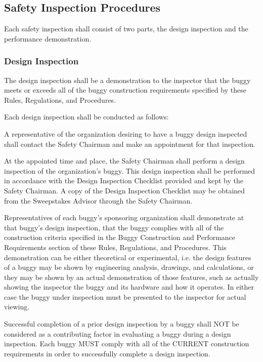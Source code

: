 \subsection{Safety Inspection Procedures}

	Each safety inspection shall consist of two parts, the design inspection and
	the performance demonstration.

\subsubsection{Design Inspection}

	The design inspection shall be a demonstration to the inspector that the buggy
	meets or exceeds all of the buggy construction requirements specified by these
	Rules, Regulations, and Procedures.

	Each design inspection shall be conducted as follows:

	A representative of the organization desiring to have a buggy design inspected
	shall contact the Safety Chairman and make an appointment for that inspection.

	At the appointed time and place, the Safety Chairman shall perform a design
	inspection of the organization's buggy. This design inspection shall be
	performed in accordance with the Design Inspection Checklist provided and kept
	by the Safety Chairman. A copy of the Design Inspection Checklist may be
	obtained from the Sweepstakes Advisor through the Safety Chairman.

	Representatives of each buggy's sponsoring organization shall demonstrate at
	that buggy's design inspection, that the buggy complies with all of the
	construction criteria specified in the Buggy Construction and Performance
	Requirements section of these Rules, Regulations, and Procedures. This
	demonstration can be either theoretical or experimental, i.e. the design
	features of a buggy may be shown by engineering analysis, drawings, and
	calculations, or they may be shown by an actual demonstration of those
	features, such as actually showing the inspector the buggy and its hardware and
	how it operates. In either case the buggy under inspection must be presented to
	the inspector for actual viewing.

	Successful completion of a prior design inspection by a buggy shall NOT be
	considered as a contributing factor in evaluating a buggy during a design
	inspection. Each buggy MUST comply with all of the CURRENT construction
	requirements in order to successfully complete a design inspection.

